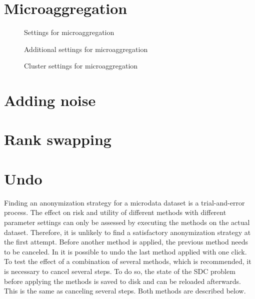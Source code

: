 \documentclass[letterpaper,10pt,english]{sphinxmanual}
\begin{document}
\section{Microaggregation}
\label{\detokenize{anon:microaggregation}}
\begin{figure}[htbp]
\centering
\capstart

\noindent{}
\caption{Settings for microaggregation}\label{\detokenize{anon:fig89}}\label{\detokenize{anon:id9}}\end{figure}

\begin{figure}[htbp]
\centering
\capstart

\noindent{}
\caption{Additional settings for microaggregation}\label{\detokenize{anon:fig810}}\label{\detokenize{anon:id10}}\end{figure}

\begin{figure}[htbp]
\centering
\capstart

\noindent{}
\caption{Cluster settings for microaggregation}\label{\detokenize{anon:fig811}}\label{\detokenize{anon:id11}}\end{figure}


\section{Adding noise}
\label{\detokenize{anon:adding-noise}}

\section{Rank swapping}
\label{\detokenize{anon:rank-swapping}}

\section{Undo}
\label{\detokenize{anon:undo}}
Finding an anonymization strategy for a microdata dataset is a trial-and-error process.
The effect on risk and utility of different methods with different parameter settings can
only be assessed by executing the methods on the actual dataset. Therefore, it is unlikely
to find a satisfactory anonymization strategy at the first attempt. Before another method
is applied, the previous method needs to be canceled. In  it is possible
to undo the last method applied with one click. To test the effect of a combination
of several methods, which is recommended, it is necessary to cancel several steps.
To do so, the state of the SDC problem before applying the methods is saved to disk and can
be reloaded afterwards. This is the same as canceling several steps. Both methods are
described below.
\end{document}
